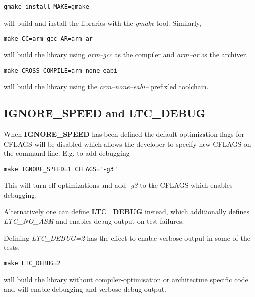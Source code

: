 \documentclass[synpaper]{book}
\begin{document}
\begin{verbatim}
gmake install MAKE=gmake
\end{verbatim}

\begin{flushleft} will build and install the libraries with the \textit{gmake} tool.  Similarly, \end{flushleft}

\begin{verbatim}
make CC=arm-gcc AR=arm-ar
\end{verbatim}

\begin{flushleft} will build the library using \textit{arm--gcc} as the compiler and \textit{arm--ar} as the archiver. \end{flushleft}

\begin{verbatim}
make CROSS_COMPILE=arm-none-eabi-
\end{verbatim}

\begin{flushleft} will build the library using the \textit{arm--none--eabi--} prefix'ed toolchain. \end{flushleft}

\subsection{IGNORE\_SPEED and LTC\_DEBUG}
 
When \textbf{IGNORE\_SPEED} has been defined the default optimization flags for CFLAGS will be disabled which allows the developer to specify new
CFLAGS on the command line.  E.g. to add debugging

\begin{verbatim}
make IGNORE_SPEED=1 CFLAGS="-g3"
\end{verbatim}

This will turn off optimizations and add \textit{-g3} to the CFLAGS which enables debugging.

Alternatively one can define \textbf{LTC\_DEBUG} instead, which additionally defines \textit{LTC\_NO\_ASM} and enables debug output on test failures.

Defining \textit{LTC\_DEBUG=2} has the effect to enable verbose output in some of the tests.

\begin{verbatim}
make LTC_DEBUG=2
\end{verbatim}

\begin{flushleft} will build the library without compiler-optimisation or architecture specific code and will enable debugging
and verbose debug output. \end{flushleft}
\end{document}
